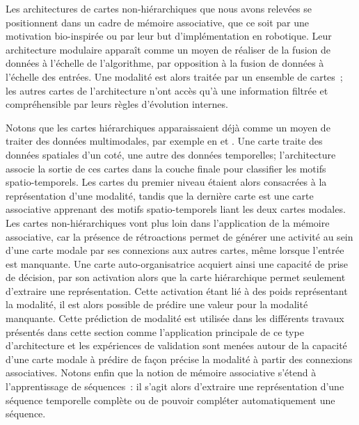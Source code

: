 \documentclass[../main]{subfiles}
\begin{document}
Les architectures de cartes non-hiérarchiques que nous avons relevées se positionnent dans un cadre de mémoire associative, que ce soit par une motivation bio-inspirée ou par leur but d'implémentation en robotique.
Leur architecture modulaire apparaît comme un moyen de réaliser de la fusion de données à l'échelle de l'algorithme, par opposition à la fusion de données à l'échelle des entrées. Une modalité est alors traitée par un ensemble de cartes~; les autres cartes de l'architecture n'ont accès qu'à une information filtrée et compréhensible par leurs règles d'évolution internes. 


Notons que les cartes hiérarchiques apparaissaient déjà comme un moyen de traiter des données multimodales, par exemple en \cite{mici_self-organizing_2018} et \cite{nawaratne_hierarchical_2020-1}. 
Une carte traite des données spatiales d'un coté, une autre des données temporelles; l'architecture associe la sortie de ces cartes dans la couche finale pour classifier les motifs spatio-temporels. Les cartes du premier niveau étaient alors consacrées à la représentation d'une modalité, tandis que la dernière carte est une carte associative apprenant des motifs spatio-temporels liant les deux cartes modales.
Les cartes non-hiérarchiques vont plus loin dans l'application de la mémoire associative, car la présence de rétroactions permet de générer une activité au sein d'une carte modale par ses connexions aux autres cartes, même lorsque l'entrée est manquante.
Une carte auto-organisatrice acquiert ainsi une capacité de prise de décision, par son activation alors que la carte hiérarchique permet seulement d'extraire une représentation.
Cette activation étant lié à des poids représentant la modalité, il est alors possible de prédire une valeur pour la modalité manquante. 
Cette prédiction de modalité est utilisée dans les différents travaux présentés dans cette section comme l'application principale de ce type d'architecture et les expériences de validation sont menées autour de la capacité d'une carte modale à prédire de façon précise la modalité à partir des connexions associatives.
Notons enfin que la notion de mémoire associative s'étend à l'apprentissage de séquences~: il s'agit alors d'extraire une représentation d'une séquence temporelle complète ou de pouvoir compléter automatiquement une séquence.
\end{document}
